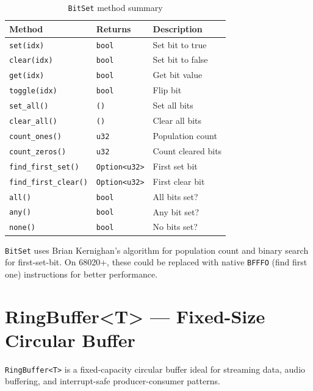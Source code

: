 \begin{table}[h]
\centering
\begin{tabular}{lll}
\textbf{Method} & \textbf{Returns} & \textbf{Description} \\
\hline
\texttt{set(idx)} & \texttt{bool} & Set bit to true \\
\texttt{clear(idx)} & \texttt{bool} & Set bit to false \\
\texttt{get(idx)} & \texttt{bool} & Get bit value \\
\texttt{toggle(idx)} & \texttt{bool} & Flip bit \\
\texttt{set\_all()} & \texttt{()} & Set all bits \\
\texttt{clear\_all()} & \texttt{()} & Clear all bits \\
\texttt{count\_ones()} & \texttt{u32} & Population count \\
\texttt{count\_zeros()} & \texttt{u32} & Count cleared bits \\
\texttt{find\_first\_set()} & \texttt{Option<u32>} & First set bit \\
\texttt{find\_first\_clear()} & \texttt{Option<u32>} & First clear bit \\
\texttt{all()} & \texttt{bool} & All bits set? \\
\texttt{any()} & \texttt{bool} & Any bit set? \\
\texttt{none()} & \texttt{bool} & No bits set? \\
\end{tabular}
\caption{\texttt{BitSet} method summary}
\end{table}

\begin{comingfromc}
\texttt{BitSet} uses Brian Kernighan's algorithm for population count and binary search for first-set-bit. On 68020+, these could be replaced with native \texttt{BFFFO} (find first one) instructions for better performance.
\end{comingfromc}

\section{RingBuffer<T> --- Fixed-Size Circular Buffer}
\label{sec:ringbuffer}

\texttt{RingBuffer<T>} is a fixed-capacity circular buffer ideal for streaming data, audio buffering, and interrupt-safe producer-consumer patterns.

